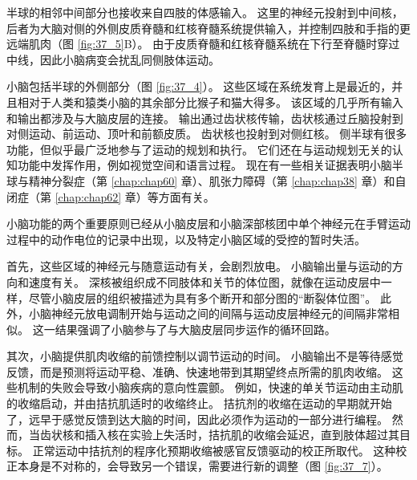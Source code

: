 半球的相邻中间部分也接收来自四肢的体感输入。 这里的神经元投射到中间核，后者为大脑对侧的外侧皮质脊髓和红核脊髓系统提供输入，并控制四肢和手指的更远端肌肉（图 \ref{fig:37_5}B）。 由于皮质脊髓和红核脊髓系统在下行至脊髓时穿过中线，因此小脑病变会扰乱同侧肢体运动。

小脑包括半球的外侧部分（图 \ref{fig:37_4}）。 这些区域在系统发育上是最近的，并且相对于人类和猿类小脑的其余部分比猴子和猫大得多。 该区域的几乎所有输入和输出都涉及与大脑皮层的连接。 输出通过齿状核传输，齿状核通过丘脑投射到对侧运动、前运动、顶叶和前额皮质。 齿状核也投射到对侧红核。 侧半球有很多功能，但似乎最广泛地参与了运动的规划和执行。 它们还在与运动规划无关的认知功能中发挥作用，例如视觉空间和语言过程。 现在有一些相关证据表明小脑半球与精神分裂症（第 \ref{chap:chap60} 章）、肌张力障碍（第 \ref{chap:chap38} 章）和自闭症（第 \ref{chap:chap62} 章）等方面有关。

小脑功能的两个重要原则已经从小脑皮层和小脑深部核团中单个神经元在手臂运动过程中的动作电位的记录中出现，以及特定小脑区域的受控的暂时失活。

首先，这些区域的神经元与随意运动有关，会剧烈放电。 小脑输出量与运动的方向和速度有关。 深核被组织成不同肢体和关节的体位图，就像在运动皮层中一样，尽管小脑皮层的组织被描述为具有多个断开和部分图的“断裂体位图”。 此外，小脑神经元放电调制开始与运动之间的间隔与运动皮层神经元的间隔非常相似。 这一结果强调了小脑参与了与大脑皮层同步运作的循环回路。

其次，小脑提供肌肉收缩的前馈控制以调节运动的时间。 小脑输出不是等待感觉反馈，而是预测将运动平稳、准确、快速地带到其期望终点所需的肌肉收缩。 这些机制的失败会导致小脑疾病的意向性震颤。 例如，快速的单关节运动由主动肌的收缩启动，并由拮抗肌适时的收缩终止。 拮抗剂的收缩在运动的早期就开始了，远早于感觉反馈到达大脑的时间，因此必须作为运动的一部分进行编程。 然而，当齿状核和插入核在实验上失活时，拮抗肌的收缩会延迟，直到肢体超过其目标。 正常运动中拮抗剂的程序化预期收缩被感官反馈驱动的校正所取代。 
这种校正本身是不对称的，会导致另一个错误，需要进行新的调整（图 \ref{fig:37_7}）。

